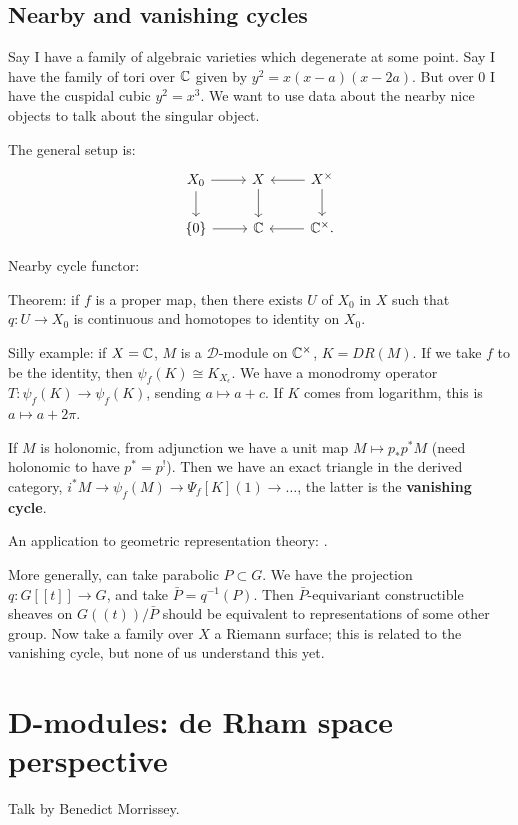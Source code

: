 \documentclass[10pt,a4paper,reqno,oneside]{book} %
\theoremstyle{plain}
\theoremstyle{definition}
\theoremstyle{remark}
\numberwithin{equation}{section}
\begin{document}
\section{Nearby and vanishing cycles}
Say I have a family of algebraic varieties which degenerate at some point. Say I have the family of tori over $\mathbb C$ given by
$y^2 = x(x-a)(x-2a)$. But over 0 I have the cuspidal cubic $y^2 = x^3$. We want to use data about the nearby nice objects to
talk about the singular object.

The general setup is:
\[
\begin{tikzcd}
X_0\arrow{r}\arrow{d} & X \arrow{d} & X^{\times} \arrow{l}\arrow{d} \\
\{0\} \arrow{r} & \C & \C^{\times} \arrow{l}.
\end{tikzcd}
\]

Nearby cycle functor: 

Theorem: if $f$ is a proper map, then there exists $U$ of $X_0$ in $X$ such that $q:U \to X_0$ is continuous and homotopes to
identity on $X_0$. 


Silly example: if $X = \mathbb C$, $M$ is a $\mathcal{D}$-module on $\mathbb C^{\times}$, $K = DR(M)$. If we take $f$ to be the identity, then
$\psi_f(K) \cong K_{X_{\epsilon}}$. We have a monodromy operator $T: \psi_f(K) \to \psi_f(K)$, sending $a \mapsto a + c$.
If $K$ comes from logarithm, this is $a \mapsto a + 2\pi$. 

If $M$ is holonomic, from adjunction we have a unit map $M \mapsto p_* p^* M$ (need holonomic to have $p^* = p^!$).
Then we have an exact triangle in the derived category, $i^*M \to \psi_f(M) \to \Psi_f[K](1) \to \dots$, the 
latter is the \textbf{vanishing cycle}.

An application to geometric representation theory: .

More generally, can take parabolic $P \subset G$. We have the projection $q: G[[t]] \to G$, and take $\bar P = q^{-1}(P)$.
Then $\bar P$-equivariant constructible sheaves on $G((t))/\bar P$ should be equivalent to representations of some other group.
Now take a family over $X$ a Riemann surface; this is related to the vanishing cycle, but none of us understand this yet.



\chapter{D-modules: de Rham space perspective}
Talk by Benedict Morrissey.
\end{document}

